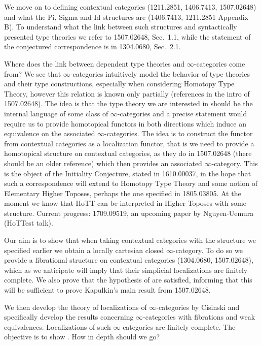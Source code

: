 \documentclass[a4paper,12pt]{scrartcl}
\begin{document}
We move on to defining contextual categories (1211.2851, 1406.7413, 1507.02648)
and what
the Pi, Sigma and Id structures are (1406.7413, 1211.2851 Appendix B). To
understand what the link between such structures and syntactically presented
type theories we refer to 1507.02648, Sec.\ 1.1, while the statement of the
conjectured correspondence is in 1304.0680, Sec.\ 2.1.

Where does the link between dependent type theories and $\infty$-categories come
from? We see that $\infty$-categories intuitively model the behavior of type
theories and their type constructions, especially when considering Homotopy Type
Theory, however this relation is known only
partially (references in the intro of 1507.02648). The idea is that the type
theory we are interested in should be the internal language of some class of
$\infty$-categories and a precise statement would require us to provide
homotopical functors in both directions which induce an equivalence on the
associated $\infty$-categories. The idea is to construct the
functor from contextual categories as a localization functor, that is we need to
provide a homotopical structure on contextual categories, as they do in
1507.02648 (there should be an older reference) which then provides an
associated $\infty$-category. This is the object of the Initiality Conjecture,
stated in 1610.00037, in the hope that such a correspondence will extend to
Homotopy Type Theory and some notion of Elementary Higher Toposes, perhaps the
one specified in 1805.03805. At the moment we know that HoTT can be interpreted
in Higher Toposes with some structure. Current progress: 1709.09519, an upcoming
paper by Nguyen-Uemura (HoTTest talk).

Our aim is to show that when taking contextual categories with the structure we
specified earlier we obtain a locally cartesian closed $\infty$-category. To do
so we provide a fibrational structure on contextual categories (1304.0680,
1507.02648), which as we anticipate will imply that their simplicial
localizations are finitely complete. We also prove that the hypothesis of
\cite[Thm.\ 7.6.16]{Cis19} are satisfied, informing that this will be sufficient
to prove Kapulkin's main result from 1507.02648.

We then develop the theory of localizations of $\infty$-categories by Cisinski
and specifically develop the results concerning $\infty$-categories with
fibrations and weak equivalences. Localizations of such $\infty$-categories are
finitely complete. The objective is to show \cite[Thm.\ 7.6.16]{Cis19}. How in
depth should we go?
\end{document}

